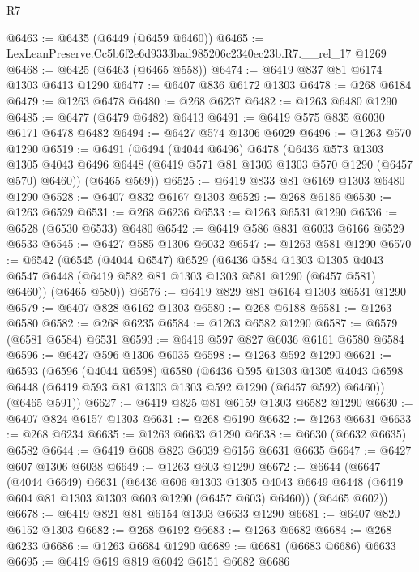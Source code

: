 \begin{lexlean}{R7}
\begin{coremodule}
@6463 := @6435 (@6449 (@6459 @6460))
@6465 := LexLeanPreserve.Cc5b6f2e6d9333bad985206c2340ec23b.R7.__rel_17 @1269
@6468 := @6425 (@6463 (@6465 @558))
@6474 := @6419 @837 @81 @6174 @1303 @6413 @1290
@6477 := @6407 @836 @6172 @1303
@6478 := @268 @6184
@6479 := @1263 @6478
@6480 := @268 @6237
@6482 := @1263 @6480 @1290
@6485 := @6477 (@6479 @6482) @6413
@6491 := @6419 @575 @835 @6030 @6171 @6478 @6482
@6494 := @6427 @574 @1306 @6029
@6496 := @1263 @570 @1290
@6519 := @6491
    (@6494
      (@4044 @6496)
      @6478
      (@6436
        @573
        @1303
        @1305
        @4043
        @6496
        @6448
        (@6419 @571 @81 @1303 @1303 @570 @1290 (@6457 @570) @6460))
      (@6465 @569))
@6525 := @6419 @833 @81 @6169 @1303 @6480 @1290
@6528 := @6407 @832 @6167 @1303
@6529 := @268 @6186
@6530 := @1263 @6529
@6531 := @268 @6236
@6533 := @1263 @6531 @1290
@6536 := @6528 (@6530 @6533) @6480
@6542 := @6419 @586 @831 @6033 @6166 @6529 @6533
@6545 := @6427 @585 @1306 @6032
@6547 := @1263 @581 @1290
@6570 := @6542
    (@6545
      (@4044 @6547)
      @6529
      (@6436
        @584
        @1303
        @1305
        @4043
        @6547
        @6448
        (@6419 @582 @81 @1303 @1303 @581 @1290 (@6457 @581) @6460))
      (@6465 @580))
@6576 := @6419 @829 @81 @6164 @1303 @6531 @1290
@6579 := @6407 @828 @6162 @1303
@6580 := @268 @6188
@6581 := @1263 @6580
@6582 := @268 @6235
@6584 := @1263 @6582 @1290
@6587 := @6579 (@6581 @6584) @6531
@6593 := @6419 @597 @827 @6036 @6161 @6580 @6584
@6596 := @6427 @596 @1306 @6035
@6598 := @1263 @592 @1290
@6621 := @6593
    (@6596
      (@4044 @6598)
      @6580
      (@6436
        @595
        @1303
        @1305
        @4043
        @6598
        @6448
        (@6419 @593 @81 @1303 @1303 @592 @1290 (@6457 @592) @6460))
      (@6465 @591))
@6627 := @6419 @825 @81 @6159 @1303 @6582 @1290
@6630 := @6407 @824 @6157 @1303
@6631 := @268 @6190
@6632 := @1263 @6631
@6633 := @268 @6234
@6635 := @1263 @6633 @1290
@6638 := @6630 (@6632 @6635) @6582
@6644 := @6419 @608 @823 @6039 @6156 @6631 @6635
@6647 := @6427 @607 @1306 @6038
@6649 := @1263 @603 @1290
@6672 := @6644
    (@6647
      (@4044 @6649)
      @6631
      (@6436
        @606
        @1303
        @1305
        @4043
        @6649
        @6448
        (@6419 @604 @81 @1303 @1303 @603 @1290 (@6457 @603) @6460))
      (@6465 @602))
@6678 := @6419 @821 @81 @6154 @1303 @6633 @1290
@6681 := @6407 @820 @6152 @1303
@6682 := @268 @6192
@6683 := @1263 @6682
@6684 := @268 @6233
@6686 := @1263 @6684 @1290
@6689 := @6681 (@6683 @6686) @6633
@6695 := @6419 @619 @819 @6042 @6151 @6682 @6686

\end{coremodule}
\end{lexlean}
